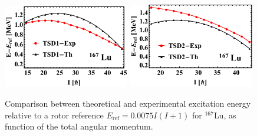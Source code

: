\begin{figure}
    \centering
    \includegraphics[width=0.49\textwidth]{Chapters/Figures/Lu-exp-energies/fig14a_lu167.pdf}
    \includegraphics[width=0.49\textwidth]{Chapters/Figures/Lu-exp-energies/fig14b_lu167.pdf}
    \caption{Comparison between theoretical and experimental excitation energy relative to a rotor reference $E_\text{ref}=0.0075I(I+1)$ for $^{167}$Lu, as function of the total angular momentum.}
    \label{reference-rotor-energy-lu167}
\end{figure}
